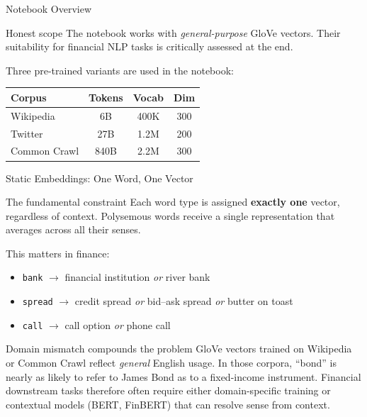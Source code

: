\documentclass[11pt,aspectratio=169,professionalfonts]{beamer}
\begin{document}
%
\begin{frame}{Notebook Overview}

\begin{alertblock}{Honest scope}
  The notebook works with \emph{general-purpose} GloVe vectors. Their
  suitability for financial NLP tasks is critically assessed at the end.
\end{alertblock}

\bigskip
Three pre-trained variants are used in the notebook:

\begin{center}
\small
\begin{tabular}{lccc}
\toprule
\textbf{Corpus} & \textbf{Tokens} & \textbf{Vocab} & \textbf{Dim} \\
\midrule
Wikipedia            & 6B  & 400K  & 300 \\
Twitter              & 27B & 1.2M  & 200 \\
Common Crawl         & 840B & 2.2M & 300 \\
\bottomrule
\end{tabular}
\end{center}

\end{frame}
%
%
\begin{frame}{Static Embeddings: One Word, One Vector}
\small
\begin{alertblock}{The fundamental constraint}
  Each word type is assigned \textbf{exactly one} vector, regardless of
  context. Polysemous words receive a single representation that averages
  across all their senses.
\end{alertblock}

This matters in finance:

\begin{itemize}
  \item \texttt{bank} $\to$ financial institution \emph{or} river bank
  \item \texttt{spread} $\to$ credit spread \emph{or} bid--ask spread
        \emph{or} butter on toast
  \item \texttt{call} $\to$ call option \emph{or} phone call
\end{itemize}

\begin{block}{Domain mismatch compounds the problem}
  GloVe vectors trained on Wikipedia or Common Crawl reflect
  \emph{general} English usage. In those corpora, ``bond'' is nearly as
  likely to refer to James Bond as to a fixed-income instrument.
  Financial downstream tasks therefore often require either domain-specific
  training or contextual models (BERT, FinBERT) that can resolve sense
  from context.
\end{block}

\end{frame}
\end{document}
